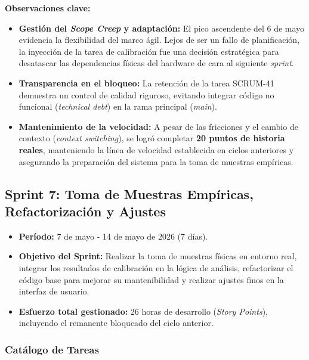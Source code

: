 
\noindent\textbf{Observaciones clave:}
\begin{itemize}
    \item \textbf{Gestión del \textit{Scope Creep} y adaptación:} El pico ascendente del 6 de mayo evidencia la flexibilidad del marco ágil. Lejos de ser un fallo de planificación, la inyección de la tarea de calibración fue una decisión estratégica para desatascar las dependencias físicas del hardware de cara al siguiente \textit{sprint}.
    \item \textbf{Transparencia en el bloqueo:} La retención de la tarea SCRUM-41 demuestra un control de calidad riguroso, evitando integrar código no funcional (\textit{technical debt}) en la rama principal (\textit{main}).
    \item \textbf{Mantenimiento de la velocidad:} A pesar de las fricciones y el cambio de contexto (\textit{context switching}), se logró completar \textbf{20 puntos de historia reales}, manteniendo la línea de velocidad establecida en ciclos anteriores y asegurando la preparación del sistema para la toma de muestras empíricas.
\end{itemize}

\subsection{Sprint 7: Toma de Muestras Empíricas, Refactorización y Ajustes}

\begin{itemize}
    \item \textbf{Período:} 7 de mayo - 14 de mayo de 2026 (7 días).
    \item \textbf{Objetivo del Sprint:} Realizar la toma de muestras físicas en entorno real, integrar los resultados de calibración en la lógica de análisis, refactorizar el código base para mejorar su mantenibilidad y realizar ajustes finos en la interfaz de usuario.
    \item \textbf{Esfuerzo total gestionado:} 26 horas de desarrollo (\textit{Story Points}), incluyendo el remanente bloqueado del ciclo anterior.
\end{itemize}

\subsubsection{Catálogo de Tareas}

